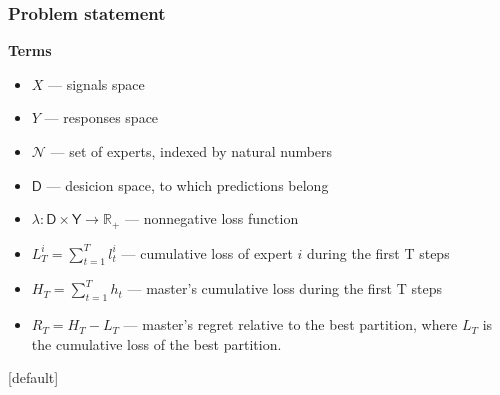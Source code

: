 \begin{frame}
\frametitle{Problem statement}

\textbf{Terms}
\begin{itemize}
\item $X$ --- signals space
\item $Y$ --- responses space
\item $\mathcal{N}$ --- set of experts, indexed by natural numbers \\
\item $\mathsf{D}$ --- desicion space, to which predictions belong \\
\item $\lambda: \mathsf{D} \times \mathsf{Y} \rightarrow \mathbb{R}_+$ --- nonnegative loss function \\

\item $L^i_T = \sum\limits_{t = 1}^T l^i_t$ --- cumulative loss of expert $i$ during the first T steps \\
\item $H_T = \sum\limits_{t = 1}^T h_t$ --- master's cumulative loss during the first T steps \\
\item $R_T= H_T - L_T$ --- master's regret relative to the best partition, where $L_T$ is the cumulative loss of the best partition. 
\end{itemize}


\end{frame}


[default]
